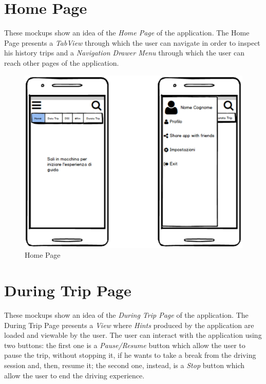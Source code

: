 \clearpage
\section{Home Page}
These mockups show an idea of the \textit{Home Page} of the application. The Home Page presents a \textit{TabView} through which the user can navigate in order to inspect his history trips and a \textit{Navigation Drawer Menu} through which the user can reach other pages of the application.\\

\begin{figure}[htbp]
\centering
\includegraphics[width=\textwidth]{cpt/img/HomePage.png}
\caption{Home Page}
\end{figure}

\clearpage
\section{During Trip Page}
These mockups show an idea of the \textit{During Trip Page} of the application. The During Trip Page presents a \textit{View} where \textit{Hints} produced by the application are loaded and viewable by the user. The user can interact with the application using two buttons: the first one is a \textit{Pause/Resume} button which allow the user to pause the trip, without stopping it, if he wants to take a break from the driving session and, then, resume it; the second one, instead, is a \textit{Stop} button which allow the user to end the driving experience.\\

